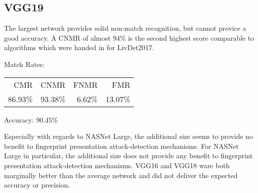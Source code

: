 \bigskip
\subsection{VGG19}

\begin{minipage}[c]{0.7\textwidth}
    The largest network provides solid non-match recognition, but cannot provice a good accuracy.
    A CNMR of almost 94\% is the second highest score comparable to algorithms which were handed in for LivDet2017.

    \medskip\noindent\centering Match Rates: 
    \begin{tabular}{ r  r  r  r |}
        CMR       & CNMR      & FNMR     & FMR     \\
        86.93\%   & 93.38\%   & 6.62\%   & 13.07\%  \\
    \end{tabular} \hspace{2mm} Accuracy: 90.45\%
\end{minipage}
\hfill
\begin{minipage}[c]{0.3\textwidth}
    \centering
    
\end{minipage}


\bigskip\noindent
Especially with regards to NASNet Large, the additional size seems to provide no benefit to fingerprint presentation attack-detection mechanisms.
For NASNet Large in particular, the additional size does not provide any benefit to fingerprint presentation attack-detection mechanisms.
VGG16 and VGG18 ware both marginally better than the average network and did not deliver the expected accuracy or precision.
